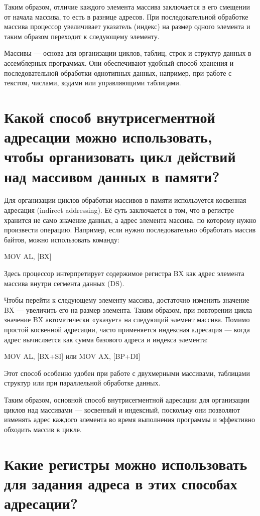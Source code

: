 Таким образом, отличие каждого элемента массива заключается в его смещении от начала массива, то есть в разнице адресов. При последовательной обработке массива процессор увеличивает указатель (индекс) на размер одного элемента и таким образом переходит к следующему элементу.

Массивы — основа для организации циклов, таблиц, строк и структур данных в ассемблерных программах. Они обеспечивают удобный способ хранения и последовательной обработки однотипных данных, например, при работе с текстом, числами, кодами или управляющими таблицами.

\section{Какой способ внутрисегментной адресации можно использовать, чтобы организовать цикл действий над массивом данных в памяти?}

Для организации циклов обработки массивов в памяти используется косвенная адресация (indirect addressing). Её суть заключается в том, что в регистре хранится не само значение данных, а адрес элемента массива, по которому нужно произвести операцию.
Например, если нужно последовательно обработать массив байтов, можно использовать команду:

MOV AL, [BX]

Здесь процессор интерпретирует содержимое регистра BX как адрес элемента массива внутри сегмента данных (DS).

Чтобы перейти к следующему элементу массива, достаточно изменить значение BX — увеличить его на размер элемента. Таким образом, при повторении цикла значение BX автоматически «указует» на следующий элемент массива.
Помимо простой косвенной адресации, часто применяется индексная адресация — когда адрес вычисляется как сумма базового адреса и индекса элемента:

MOV AL, [BX+SI]
или
MOV AX, [BP+DI]

Этот способ особенно удобен при работе с двухмерными массивами, таблицами структур или при параллельной обработке данных.

Таким образом, основной способ внутрисегментной адресации для организации циклов над массивами — косвенный и индексный, поскольку они позволяют изменять адрес каждого элемента во время выполнения программы и эффективно обходить массив в цикле.

\section{Какие регистры можно использовать для задания адреса в этих способах адресации?}

